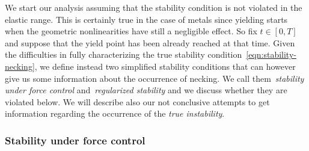 \documentclass[a4paper,10pt,oneside]{amsbook}
\numberwithin{section}{chapter}
\numberwithin{equation}{chapter}
\theoremstyle{definition}
\begin{document}
We start our analysis assuming that the stability condition is not violated in the elastic range. This is certainly true in the case of metals since yielding starts when the geometric nonlinearities have still a negligible effect. So fix $t\in[0,T]$ and suppose that the yield point has been already reached at that time. Given the difficulties in fully characterizing the true stability condition~\eqref{eqn:stability-necking}, we define instead two simplified stability conditions that can however give us some information about the occurrence of necking. We call them~\emph{stability under force control} and~\emph{regularized stability} and we discuss whether they are violated below. We will describe also our not conclusive attempts to get information regarding the occurrence of the \emph{true instability}.

\subsubsection*{Stability under force control}
\end{document}
